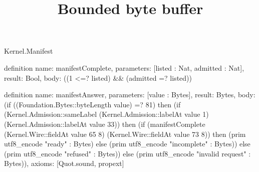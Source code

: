 \begin{lexlean}{Kernel.Manifest}
\title{Bounded byte buffer}
\begin{semanticmodule}
definition{
  name: manifestComplete,
  parameters: [listed : Nat, admitted : Nat],
  result: Bool,
  body: ((1 <=? listed) && (admitted =? listed))
}

definition{
  name: manifestAnswer,
  parameters: [value : Bytes],
  result: Bytes,
  body: (if ((Foundation.Bytes::byteLength value) =? 81) then (if (Kernel.Admission::sameLabel (Kernel.Admission::labelAt value 1) (Kernel.Admission::labelAt value 33)) then (if (manifestComplete (Kernel.Wire::fieldAt value 65 8) (Kernel.Wire::fieldAt value 73 8)) then (prim utf8_encode "ready" : Bytes) else (prim utf8_encode "incomplete" : Bytes)) else (prim utf8_encode "refused" : Bytes)) else (prim utf8_encode "invalid request" : Bytes)),
  axioms: [Quot.sound, propext]
}
\end{semanticmodule}
\end{lexlean}
